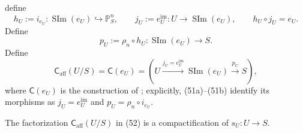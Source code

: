 \begin{definition}
  define
  \[
    h_U:=i_{e_U}\colon\operatorname{SIm}(e_U)\hookrightarrow
      \mathbb P^n_S,
    \qquad
    j_U:=e_U^{\mathrm{im}}\colon U\to\operatorname{SIm}(e_U),
    \qquad
    h_U\circ j_U=e_U.                                             \tag{51a}
  \]
  Define
  \[
    p_U:=\rho_n\circ h_U
      \colon\operatorname{SIm}(e_U)\to S.                         \tag{51b}
  \]
  Define
  \[
    \mathsf C_{\mathrm{aff}}(U/S)
      =\mathsf C(e_U)
      =
      \left(
        U\xrightarrow{j_U=e_U^{\mathrm{im}}}
        \operatorname{SIm}(e_U)
        \xrightarrow{p_U}S
      \right),                                                     \tag{52}
  \]
  where $\mathsf C(e_U)$ is the construction of
  ; explicitly,
  (51a)--(51b) identify its morphisms as
  $j_U=e_U^{\mathrm{im}}$ and $p_U=\rho_n\circ i_{e_U}$.
\end{definition}

\begin{proposition}
  \label{prop:nagata-affine-compactification}
  \lean{}

  The factorization $\mathsf C_{\mathrm{aff}}(U/S)$ in (52) is a
  compactification of $s_U\colon U\to S$.
\end{proposition}

